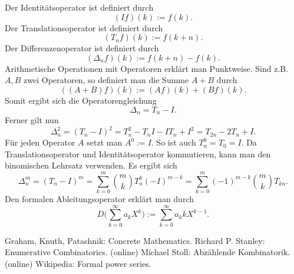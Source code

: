 \documentclass[a4paper,12pt,fleqn,twoside]{article}
\begin{document}
Der Identitätsoperator ist definiert durch
\begin{equation}
(If)(k) := f(k).
\end{equation}
Der Translationsoperator ist definiert durch
\begin{equation}
(T_n f)(k) := f(k+n).
\end{equation}
Der Differenzenoperator ist definiert durch
\begin{equation}
(\Delta_n f)(k) := f(k+n)-f(k).
\end{equation}
Arithmetische Operationen mit Operatoren erklärt man Punktweise.
Sind z.B. $A,B$ zwei Operatoren, so definiert man die Summe $A+B$
durch
\begin{equation}
((A+B)f)(k):=(A f)(k)+(B f)(k).
\end{equation}
Somit ergibt sich die Operatorengleichung
\begin{equation}
\Delta_n = T_n-I.
\end{equation}
Ferner gilt nun
\begin{equation}
\Delta_n^2 = (T_n-I)^2
= T_n^2-T_nI-IT_n+I^2
= T_{2n}-2T_n+I.
\end{equation}
Für jeden Operator $A$ setzt man $A^0:=I$. So ist auch $T_n^0=T_0=I$.
Da Translationsoperator und Identitätsoperator kommutieren, kann
man den binomischen Lehrsatz verwenden. Es ergibt sich
\[\Delta_n^m = (T_n-I)^m
= \sum_{k=0}^m \binom{m}{k} T_n^k (-I)^{m-k}
= \sum_{k=0}^m (-1)^{m-k}\binom{m}{k} T_{kn}.\]
Den formalen Ableitungsoperator erklärt man durch
\begin{equation}
D\Big(\sum_{k=0}^\infty a_kX^k\Big)
:= \sum_{k=0}^\infty a_k kX^{k-1}.
\end{equation}


\begin{thebibliography}{10}
\setlength{\itemsep}{0pt}
 Graham, Knuth, Patashnik: Concrete Mathematics.
 Richard P. Stanley: Enumerative Combinatorics. (online)
 Michael Stoll: Abzählende Kombinatorik. (online)
 Wikipedia: Formal power series.
\end{thebibliography}
\end{document}
